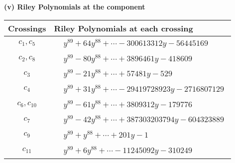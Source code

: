 \documentclass[1p]{elsarticle_modified}
\theoremstyle{definition}
\begin{document}
\newpage\renewcommand{\arraystretch}{1}
\flushleft \textbf{(v) Riley Polynomials at the component}\newline \\
\begin{tabular}{m{50pt}|m{274pt}}
Crossings & \hspace{64pt}Riley Polynomials at each crossing \\
\hline $$\begin{aligned}c_{1},c_{5}\end{aligned}$$&$\begin{aligned}
&y^{89}+64 y^{88}+\cdots-300613312 y-56445169
\end{aligned}$\\
\hline $$\begin{aligned}c_{2},c_{8}\end{aligned}$$&$\begin{aligned}
&y^{89}-80 y^{88}+\cdots+3896461 y-418609
\end{aligned}$\\
\hline $$\begin{aligned}c_{3}\end{aligned}$$&$\begin{aligned}
&y^{89}-21 y^{88}+\cdots+57481 y-529
\end{aligned}$\\
\hline $$\begin{aligned}c_{4}\end{aligned}$$&$\begin{aligned}
&y^{89}+31 y^{88}+\cdots-29419728923 y-2716807129
\end{aligned}$\\
\hline $$\begin{aligned}c_{6},c_{10}\end{aligned}$$&$\begin{aligned}
&y^{89}-61 y^{88}+\cdots+3809312 y-179776
\end{aligned}$\\
\hline $$\begin{aligned}c_{7}\end{aligned}$$&$\begin{aligned}
&y^{89}-42 y^{88}+\cdots+387303203794 y-604323889
\end{aligned}$\\
\hline $$\begin{aligned}c_{9}\end{aligned}$$&$\begin{aligned}
&y^{89}+y^{88}+\cdots+201 y-1
\end{aligned}$\\
\hline $$\begin{aligned}c_{11}\end{aligned}$$&$\begin{aligned}
&y^{89}+6 y^{88}+\cdots-11245092 y-310249
\end{aligned}$\\
\hline
\end{tabular}\\~\\
\end{document}
